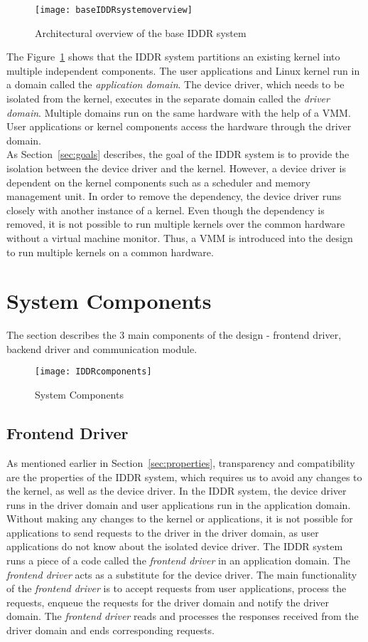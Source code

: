 \begin{figure}[!ht]
\centering
\texttt{[image: baseIDDRsystemoverview]}
\caption{Architectural overview of the base IDDR system}
\label{fig:base IDDR system overview}
\end{figure}
The Figure~\ref{fig:base IDDR system overview} shows that the IDDR system partitions an existing kernel into multiple independent components. The user applications and Linux kernel run in a domain called the \textit{application domain}. The device driver, which needs to be isolated from the kernel, executes in the separate domain called the \textit{driver domain}. Multiple domains run on the same hardware with the help of a VMM. User applications or kernel components access the hardware through the driver domain.
\\[3mm]
As Section~\ref{sec:goals} describes, the goal of the IDDR system is to provide the isolation between the device driver and the kernel. However, a device driver is dependent on the kernel components such as a scheduler and memory management unit. In order to remove the dependency, the device driver runs closely with another instance of a kernel. Even though the dependency is removed, it is not possible to run multiple kernels over the common hardware without a virtual machine monitor. Thus, a VMM is introduced into the design to run multiple kernels on a common hardware. 

\section{System Components}\label{components}
The section describes the 3 main components of the design - frontend driver, backend driver and communication module.
\begin{figure}[!ht]
\centering
\texttt{[image: IDDRcomponents]}
\caption{System Components}
\label{fig:Design Evo1}
\end{figure}

\subsection{Frontend Driver}
\label{subsec:frontend}
As mentioned earlier in Section~\ref{sec:properties}, transparency and compatibility are the properties of the IDDR system, which requires us to avoid any changes to the kernel, as well as the device driver. In the IDDR system, the device driver runs in the driver domain and user applications run in the application domain. Without making any changes to the kernel or applications, it is not possible for applications to send requests to the driver in the driver domain, as user applications do not know about the isolated device driver. The IDDR system runs a piece of a code called the \textit{frontend driver} in an application domain. The \textit{frontend driver} acts as a substitute for the device driver. The main functionality of the \textit{frontend driver} is to accept requests from user applications, process the requests, enqueue the requests for the driver domain and notify the driver domain. The \textit{frontend driver} reads and processes the responses received from the driver domain and ends corresponding requests.


